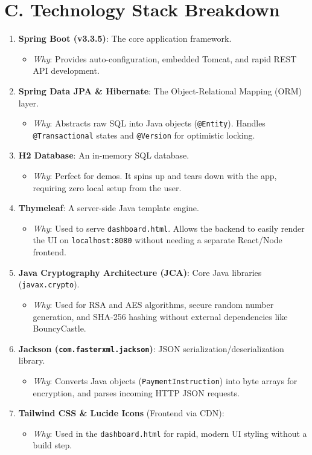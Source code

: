 \documentclass[11pt, a4paper]{article}
\begin{document}
\section*{C. Technology Stack Breakdown}

\begin{enumerate}
    \item \textbf{Spring Boot (v3.3.5)}: The core application framework.
    \begin{itemize}
        \item \textit{Why}: Provides auto-configuration, embedded Tomcat, and rapid REST API development.
    \end{itemize}
    \item \textbf{Spring Data JPA \& Hibernate}: The Object-Relational Mapping (ORM) layer.
    \begin{itemize}
        \item \textit{Why}: Abstracts raw SQL into Java objects (\texttt{@Entity}). Handles \texttt{@Transactional} states and \texttt{@Version} for optimistic locking.
    \end{itemize}
    \item \textbf{H2 Database}: An in-memory SQL database.
    \begin{itemize}
        \item \textit{Why}: Perfect for demos. It spins up and tears down with the app, requiring zero local setup from the user.
    \end{itemize}
    \item \textbf{Thymeleaf}: A server-side Java template engine.
    \begin{itemize}
        \item \textit{Why}: Used to serve \texttt{dashboard.html}. Allows the backend to easily render the UI on \texttt{localhost:8080} without needing a separate React/Node frontend.
    \end{itemize}
    \item \textbf{Java Cryptography Architecture (JCA)}: Core Java libraries (\texttt{javax.crypto}).
    \begin{itemize}
        \item \textit{Why}: Used for RSA and AES algorithms, secure random number generation, and SHA-256 hashing without external dependencies like BouncyCastle.
    \end{itemize}
    \item \textbf{Jackson (\texttt{com.fasterxml.jackson})}: JSON serialization/deserialization library.
    \begin{itemize}
        \item \textit{Why}: Converts Java objects (\texttt{PaymentInstruction}) into byte arrays for encryption, and parses incoming HTTP JSON requests.
    \end{itemize}
    \item \textbf{Tailwind CSS \& Lucide Icons} (Frontend via CDN):
    \begin{itemize}
        \item \textit{Why}: Used in the \texttt{dashboard.html} for rapid, modern UI styling without a build step.
    \end{itemize}
\end{enumerate}
\end{document}
